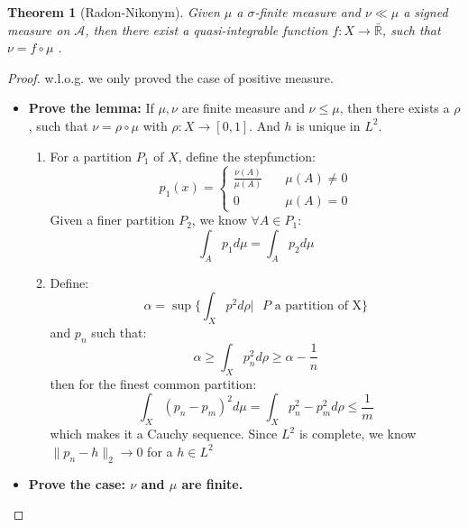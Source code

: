 \documentclass[a4paper,11pt,oneside,fleqn]{book}
\newtheorem{theorem}{Theorem}[section]
\theoremstyle{definition}
\theoremstyle{remark}
\begin{document}
\begin{theorem}[Radon-Nikonym]
	Given $\mu$ a $\sigma$-finite measure and $\nu \ll \mu$ a signed measure on $\mathcal{A}$, then there exist a quasi-integrable function $f: X \rightarrow \bar{\mathbb{R}}$, such that $\nu = f \circ \mu$ . 
\end{theorem}
\begin{proof}
	w.l.o.g. we only proved the case of positive measure.
	\begin{itemize}
		\item \textbf{Prove the lemma:} If $\mu, \nu$ are finite measure and $\nu \leq \mu$, then there exists a $\rho$, such that $\nu = \rho \circ \mu$ with $\rho: X \rightarrow [0, 1]$. And $h$ is unique in $L^2$. \par
			 
		\begin{enumerate}
			\item For a partition $P_1$ of $X$, define the stepfunction:
				\begin{equation*}
					p_1(x) =\left\{ \begin{aligned}
						\frac{\nu(A)}{\mu(A)} \quad &\mu(A) \neq 0 \\
						0 \quad &\mu(A) = 0
					\end{aligned}
					\right.
				\end{equation*}
			Given a finer partition $P_2$, we know $\forall A \in P_1:$
				\begin{equation*}
					\int_A p_1 d\mu = \int_A p_2 d\mu 
				\end{equation*} 
			\item Define:
				\begin{equation*}
					\alpha = \sup\{\int_X p^2 d\rho |\text{ $P$ a partition of X} \}
				\end{equation*}
				and $p_n$ such that:
				\begin{equation*}
					\alpha \geq \int_X p_n^2 d\rho \geq \alpha - \frac{1}{n} 
				\end{equation*}
				then for the finest common partition:
				\begin{equation*}
					\int_X (p_n - p_m)^2 d \mu = \int_X p_n^2 - p_m^2 d\rho \leq \frac{1}{m}
				\end{equation*}
				which makes it a Cauchy sequence. Since $L^2$ is complete, we know $\|p_n - h\|_2 \rightarrow 0$ for a $h \in L^2$
		\end{enumerate}
		\item \textbf{Prove the case: $\nu$ and $\mu$ are finite.}\par 

\end{itemize}
\end{proof}
\end{document}
